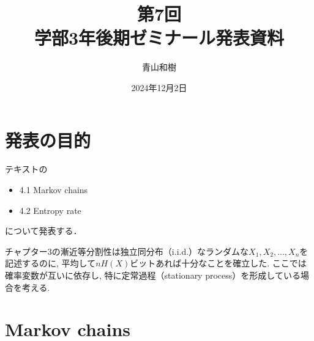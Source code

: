 \documentclass[a4j]{jsarticle}
\title{第7回\\学部3年後期ゼミナール発表資料}
\author{青山和樹}
\date{2024年12月2日}
\begin{document}
\maketitle

\section*{発表の目的}
テキスト\cite{text}の
\begin{itemize}
	\item 4.1 Markov chains
	\item 4.2 Entropy rate
\end{itemize}
について発表する．


\tableofcontents

\clearpage



チャプター3の漸近等分割性は独立同分布（i.i.d.）なランダムな$X_1, X_2, \ldots , X_n$を記述するのに, 平均して$nH(X)$ビットあれば十分なことを確立した. ここでは確率変数が互いに依存し, 特に定常過程（stationary process）を形成している場合を考える.


\section{Markov chains}
\end{document}
